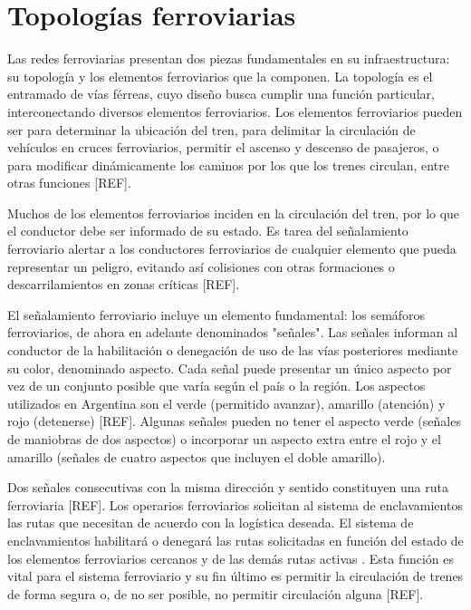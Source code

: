 \section{Topologías ferroviarias}
    \label{sec:topologias}
    Las redes ferroviarias presentan dos piezas fundamentales en su infraestructura: su topología y los elementos ferroviarios que la componen. La topología es el entramado de vías férreas, cuyo diseño busca cumplir una función particular, interconectando diversos elementos ferroviarios. Los elementos ferroviarios pueden ser para determinar la ubicación del tren, para delimitar la circulación de vehículos en cruces ferroviarios, permitir el ascenso y descenso de pasajeros, o para modificar dinámicamente los caminos por los que los trenes circulan, entre otras funciones [REF].

    Muchos de los elementos ferroviarios inciden en la circulación del tren, por lo que el conductor debe ser informado de su estado. Es tarea del señalamiento ferroviario alertar a los conductores ferroviarios de cualquier elemento que pueda representar un peligro, evitando así colisiones con otras formaciones o descarrilamientos en zonas críticas [REF]. 
    
    El señalamiento ferroviario incluye un elemento fundamental: los semáforos ferroviarios, de ahora en adelante denominados "señales". Las señales informan al conductor de la habilitación o denegación de uso de las vías posteriores mediante su color, denominado aspecto. Cada señal puede presentar un único aspecto por vez de un conjunto posible que varía según el país o la región. Los aspectos utilizados en Argentina son el verde (permitido avanzar), amarillo (atención) y rojo (detenerse) [REF]. Algunas señales pueden no tener el aspecto verde (señales de maniobras de dos aspectos) o incorporar un aspecto extra entre el rojo y el amarillo (señales de cuatro aspectos que incluyen el doble amarillo).
    
    Dos señales consecutivas con la misma dirección y sentido constituyen una ruta ferroviaria [REF]. Los operarios ferroviarios solicitan al sistema de enclavamientos las rutas que necesitan de acuerdo con la logística deseada. El sistema de enclavamientos habilitará o denegará las rutas solicitadas en función del estado de los elementos ferroviarios cercanos y de las demás rutas activas . Esta función es vital para el sistema ferroviario y su fin último es permitir la circulación de trenes de forma segura o, de no ser posible, no permitir circulación alguna [REF].

    
    
    
    